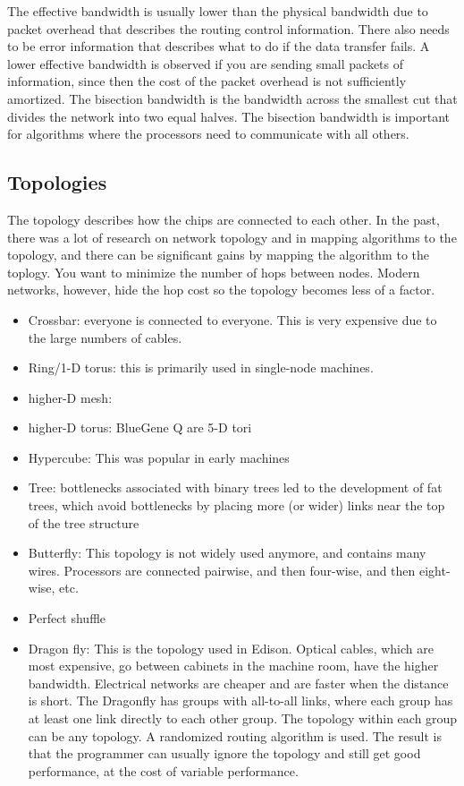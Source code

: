 \documentclass[10pt]{article}
\begin{document}
\begin{flushleft}
The effective bandwidth is usually lower than the physical bandwidth due to packet overhead that describes the routing control information. There also needs to be error information that describes what to do if the data transfer fails. A lower effective bandwidth is observed if you are sending small packets of information, since then the cost of the packet overhead is not sufficiently amortized. The bisection bandwidth is the bandwidth across the smallest cut that divides the network into two equal halves. The bisection bandwidth is important for algorithms where the processors need to communicate with all others.

\subsection{Topologies}

The topology describes how the chips are connected to each other. In the past, there was a lot of research on network topology and in mapping algorithms to the topology, and there can be significant gains by mapping the algorithm to the toplogy. You want to minimize the number of hops between nodes. Modern networks, however, hide the hop cost so the topology becomes less of a factor.

\begin{itemize}
\item Crossbar: everyone is connected to everyone. This is very expensive due to the large numbers of cables.
\item Ring/1-D torus: this is primarily used in single-node machines. 
\item higher-D mesh: 
\item higher-D torus: BlueGene Q are 5-D tori
\item Hypercube: This was popular in early machines
\item Tree: bottlenecks associated with binary trees led to the development of fat trees, which avoid bottlenecks by placing more (or wider) links near the top of the tree structure
\item Butterfly: This topology is not widely used anymore, and contains many wires. Processors are connected pairwise, and then four-wise, and then eight-wise, etc. 
\item Perfect shuffle
\item Dragon fly: This is the topology used in Edison. Optical cables, which are most expensive, go between cabinets in the machine room, have the higher bandwidth. Electrical networks are cheaper and are faster when the distance is short. The Dragonfly has groups with all-to-all links, where each group has at least one link directly to each other group. The topology within each group can be any topology. A randomized routing algorithm is used. The result is that the programmer can usually ignore the topology and still get good performance, at the cost of variable performance.
\end{itemize}


\end{flushleft}
\end{document}
